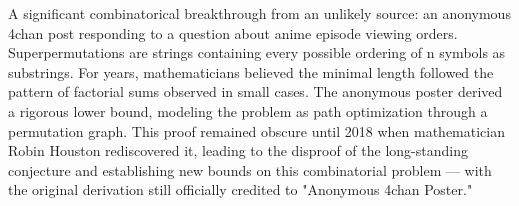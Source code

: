 A significant combinatorical breakthrough from an unlikely source: an anonymous 4chan post responding to a question about anime episode viewing orders. Superpermutations are strings containing every possible ordering of n symbols as substrings. For years, mathematicians believed the minimal length followed the pattern of factorial sums observed in small cases. The anonymous poster derived a rigorous lower bound, modeling the problem as path optimization through a permutation graph. This proof remained obscure until 2018 when mathematician Robin Houston rediscovered it, leading to the disproof of the long-standing conjecture and establishing new bounds on this combinatorial problem — with the original derivation still officially credited to "Anonymous 4chan Poster."
